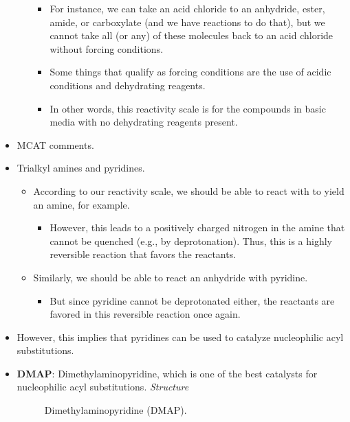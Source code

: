 \documentclass[../notes.tex]{subfiles}
\begin{document}
\begin{itemize}
\begin{itemize}
        \begin{itemize}
            \item For instance, we can take an acid chloride to an anhydride, ester, amide, or carboxylate (and we have reactions to do that), but we cannot take all (or any) of these molecules back to an acid chloride without forcing conditions.
            \item Some things that qualify as forcing conditions are the use of acidic conditions and dehydrating reagents.
            \item In other words, this reactivity scale is for the compounds in basic media with no dehydrating reagents present.
        \end{itemize}
    \end{itemize}
    \item MCAT comments.
    \item Trialkyl amines and pyridines.
    \begin{itemize}
        \item According to our reactivity scale, we should be able to react  with  to yield an amine, for example.
        \begin{itemize}
            \item However, this leads to a positively charged nitrogen in the amine that cannot be quenched (e.g., by deprotonation). Thus, this is a highly reversible reaction that favors the reactants.
        \end{itemize}
        \item Similarly, we should be able to react an anhydride with pyridine.
        \begin{itemize}
            \item But since pyridine cannot be deprotonated either, the reactants are favored in this reversible reaction once again.
        \end{itemize}
    \end{itemize}
    \item However, this implies that pyridines can be used to catalyze nucleophilic acyl substitutions.
    \item \textbf{DMAP}: Dimethylaminopyridine, which is one of the best catalysts for nucleophilic acyl substitutions. \emph{Structure}
    \begin{figure}[h!]
        \centering
        \footnotesize
        \caption{Dimethylaminopyridine (DMAP).}
        \label{fig:DMAP}
    \end{figure}

\end{itemize}
\end{document}
